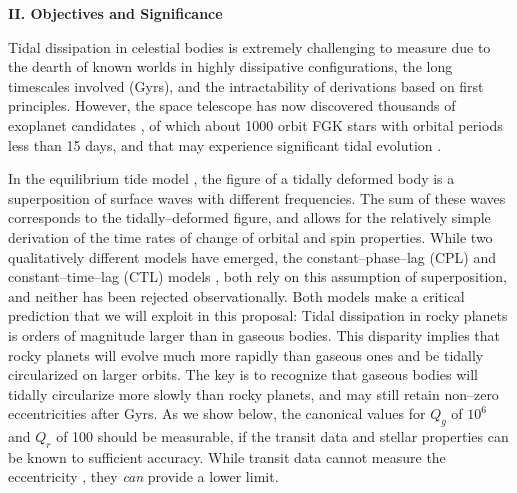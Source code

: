 \bigskip
\centerline{\bf II. Objectives and Significance}
\smallskip

\medskip
{\centerline{}}
\smallskip

Tidal dissipation in celestial bodies is extremely challenging to
measure
\citep{GoldreichSoter66,Hut81,AksnesFranklin01,Jackson08,Jackson09,Lainey12}
due to the dearth of known worlds in highly dissipative
configurations, the long timescales involved (Gyrs), and the
intractability of derivations based on first principles.  However,
the \kepler space telescope has now discovered thousands of exoplanet
candidates
\citep{2013ApJS..204...24B}, of which about 1000 orbit FGK stars with
orbital periods less than 15 days, and that may experience significant
tidal evolution \citep{Rasio96,Jackson08,Matsumura10}.

In the equilibrium tide model
\citep{Darwin1880,MacDonald64,GoldreichSoter66,Hut81,FerrazMello08,Leconte10},
the figure of a tidally deformed body is a superposition of surface
waves with different frequencies.  The sum of these waves corresponds
to the tidally--deformed figure, and allows for the relatively simple
derivation of the time rates of change of orbital and spin properties.
While two qualitatively different models have emerged, the
constant--phase--lag (CPL) and constant--time--lag (CTL) models
\citep{Greenberg09}, both rely on this assumption of superposition,
and neither has been rejected observationally.  Both models make a
critical prediction that we will exploit in this proposal: Tidal
dissipation in rocky planets is orders of magnitude larger than in
gaseous bodies.  This disparity implies that rocky planets will evolve
much more rapidly than gaseous ones and be tidally circularized on
larger orbits.  The key is to recognize that gaseous bodies will
tidally circularize more slowly than rocky planets, and may still
retain non--zero eccentricities after Gyrs.
%
As we show below, the canonical values for $Q_g$ of $10^6$ and $Q_r$
of 100 should be measurable, if the transit data and stellar
properties can be known to sufficient accuracy.  While transit data
cannot measure the
eccentricity \citep{Barnes07,Burke08,2008ApJ...678.1407F}, they {\it
can} provide a lower limit.

\medskip
{\centerline{}}
\smallskip


